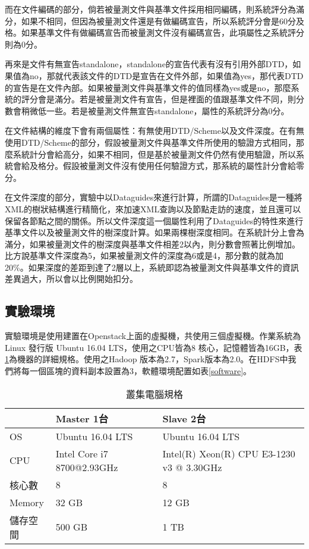 而在文件編碼的部分，倘若被量測文件與基準文件採用相同編碼，則系統評分為滿分，如果不相同，但因為被量測文件還是有做編碼宣告，所以系統評分會是60分及格。如果基準文件有做編碼宣告而被量測文件沒有編碼宣告，此項屬性之系統評分則為0分。\\\par

再來是文件有無宣告standalone，standalone的宣告代表有沒有引用外部DTD，如果值為no，那就代表該文件的DTD是宣告在文件外部，如果值為yes，那代表DTD的宣告是在文件內部。如果被量測文件與基準文件的值同樣為yes或是no，那麼系統的評分會是滿分。若是被量測文件有宣告，但是裡面的值跟基準文件不同，則分數會稍微低一些。若是被量測文件無宣告standalone，屬性的系統評分為0分。\\\par

在文件結構的維度下會有兩個屬性：有無使用DTD/Scheme以及文件深度。在有無使用DTD/Scheme的部分，假設被量測文件與基準文件所使用的驗證方式相同，那麼系統計分會給高分，如果不相同，但是基於被量測文件仍然有使用驗證，所以系統會給及格分。假設被量測文件沒有使用任何驗證方式，那系統的屬性計分會給零分。\\\par
在文件深度的部分，實驗中以Dataguides\cite{oem}\cite{dataguides}\cite{oemweb}來進行計算，所謂的Dataguides是一種將XML的樹狀結構進行精簡化，來加速XML查詢以及節點走訪的速度，並且還可以保留各節點之間的關係。所以文件深度這一個屬性利用了Dataguides的特性來進行基準文件以及被量測文件的樹深度計算。如果兩棵樹深度相同。在系統計分上會為滿分，如果被量測文件的樹深度與基準文件相差2以內，則分數會照著比例增加。比方說基準文件深度為5，如果被量測文件的深度為6或是4，那分數的就為加20\%。如果深度的差距到達了2層以上，系統即認為被量測文件與基準文件的資訊差異過大，所以會以比例開始扣分。

\subsection{實驗環境}
實驗環境是使用建置在Openstack上面的虛擬機，共使用三個虛擬機。作業系統為Linux 發行版 Ubuntu 16.04 LTS，使用之CPU皆為8 核心，記憶體皆為16GB，表\ref{cluster}為機器的詳細規格。使用之Hadoop 版本為2.7，Spark版本為2.0。在HDFS中我們將每一個區塊的資料副本設置為3，軟體環境配置如表\ref{software}。
\begin{table}[H]
\begin{center}
\caption{叢集電腦規格}
\label{cluster}
\begin{tabular}{|p{3cm}<{\centering}|p{3cm}<{\centering}|p{3cm}<{\centering}|}
\hline
&Master 1台&Slave 2台\\
\hline
OS&Ubuntu 16.04 LTS&Ubuntu 16.04 LTS\\
\hline
CPU&Intel Core i7 8700@2.93GHz&Intel(R) Xeon(R) CPU E3-1230 v3 @ 3.30GHz\\
\hline
核心數&8&8\\
\hline
Memory&32 GB&12 GB\\
\hline
儲存空間&500 GB&1 TB\\
\hline
\end{tabular}
\end{center}
\end{table}

